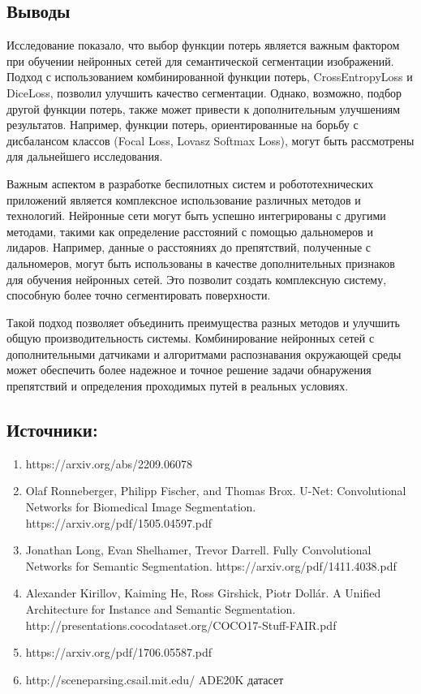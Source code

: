\documentclass[11pt]{article}
\providecommand{\tightlist}{%
      \setlength{\itemsep}{0pt}\setlength{\parskip}{0pt}}
\begin{document}
    \hypertarget{ux432ux44bux432ux43eux434ux44b}{%
\subsection{Выводы}\label{ux432ux44bux432ux43eux434ux44b}}

Исследование показало, что выбор функции потерь является важным фактором
при обучении нейронных сетей для семантической сегментации изображений.
Подход с использованием комбинированной функции потерь, CrossEntropyLoss
и DiceLoss, позволил улучшить качество сегментации. Однако, возможно,
подбор другой функции потерь, также может привести к дополнительным
улучшениям результатов. Например, функции потерь, ориентированные на
борьбу с дисбалансом классов (Focal Loss, Lovasz Softmax Loss), могут
быть рассмотрены для дальнейшего исследования.

Важным аспектом в разработке беспилотных систем и робототехнических
приложений является комплексное использование различных методов и
технологий. Нейронные сети могут быть успешно интегрированы с другими
методами, такими как определение расстояний с помощью дальномеров и
лидаров. Например, данные о расстояниях до препятствий, полученные с
дальномеров, могут быть использованы в качестве дополнительных признаков
для обучения нейронных сетей. Это позволит создать комплексную систему,
способную более точно сегментировать поверхности.

Такой подход позволяет объединить преимущества разных методов и улучшить
общую производительность системы. Комбинирование нейронных сетей с
дополнительными датчиками и алгоритмами распознавания окружающей среды
может обеспечить более надежное и точное решение задачи обнаружения
препятствий и определения проходимых путей в реальных условиях.

    \hypertarget{ux438ux441ux442ux43eux447ux43dux438ux43aux438}{%
\subsection{Источники:}\label{ux438ux441ux442ux43eux447ux43dux438ux43aux438}}

\begin{enumerate}
\def\labelenumi{\arabic{enumi}.}
\tightlist
\item
  https://arxiv.org/abs/2209.06078
\item
  Olaf Ronneberger, Philipp Fischer, and Thomas Brox. U-Net:
  Convolutional Networks for Biomedical Image Segmentation.
  https://arxiv.org/pdf/1505.04597.pdf
\item
  Jonathan Long, Evan Shelhamer, Trevor Darrell. Fully Convolutional
  Networks for Semantic Segmentation.
  https://arxiv.org/pdf/1411.4038.pdf
\item
  Alexander Kirillov, Kaiming He, Ross Girshick, Piotr Dollár. A Unified
  Architecture for Instance and Semantic Segmentation.
  http://presentations.cocodataset.org/COCO17-Stuff-FAIR.pdf
\item
  https://arxiv.org/pdf/1706.05587.pdf
\item
  http://sceneparsing.csail.mit.edu/ ADE20K датасет
\end{enumerate}

    


    
    
    
\end{document}
